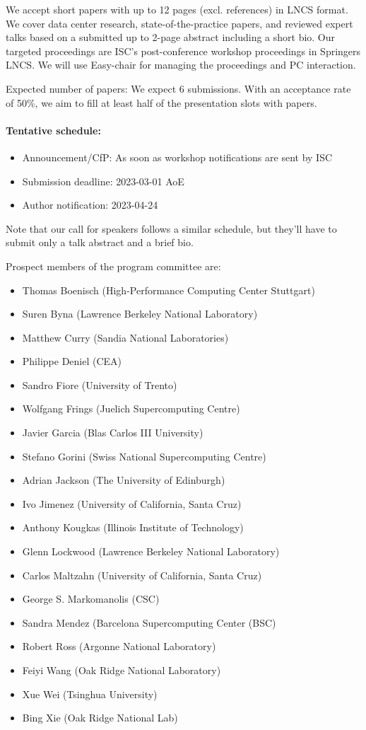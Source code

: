 \documentclass[a4paper,10pt]{article}
\begin{document}
We accept short papers with up to 12 pages (excl. references) in LNCS format.
We cover data center research, state-of-the-practice papers, and reviewed expert talks based on a submitted up to 2-page abstract including a short bio.
Our targeted proceedings are ISC's post-conference workshop proceedings in Springers LNCS.
We will use Easy-chair for managing the proceedings and PC interaction.

Expected number of papers: We expect 6 submissions.
With an acceptance rate of 50\%, we aim to fill at least half of the presentation slots with papers.

\paragraph{Tentative schedule:}
\begin{itemize}
  \item Announcement/CfP: As soon as workshop notifications are sent by ISC
  \item Submission deadline: 2023-03-01 AoE
  \item Author notification: 2023-04-24
\end{itemize}
Note that our call for speakers follows a similar schedule, but they'll have to submit only a talk abstract and a brief bio.

Prospect members of the program committee are:
\begin{itemize}
 \item Thomas Boenisch (High-Performance Computing Center Stuttgart)
 \item Suren Byna (Lawrence Berkeley National Laboratory)
 \item Matthew Curry (Sandia National Laboratories)
 \item Philippe Deniel (CEA)
 \item Sandro Fiore (University of Trento)
 \item Wolfgang Frings (Juelich Supercomputing Centre)
 \item Javier Garcia (Blas Carlos III University)
 \item Stefano Gorini (Swiss National Supercomputing Centre)
 \item Adrian Jackson (The University of Edinburgh)
 \item Ivo Jimenez (University of California, Santa Cruz)
 \item Anthony Kougkas (Illinois Institute of Technology)
 \item Glenn Lockwood (Lawrence Berkeley National Laboratory)
 \item Carlos Maltzahn (University of California, Santa Cruz)
 \item George S. Markomanolis (CSC)
 \item Sandra Mendez (Barcelona Supercomputing Center (BSC)
 \item Robert Ross (Argonne National Laboratory)
 \item Feiyi Wang (Oak Ridge National Laboratory)
 \item Xue Wei (Tsinghua University)
 \item Bing Xie (Oak Ridge National Lab)
\end{itemize}
\end{document}
